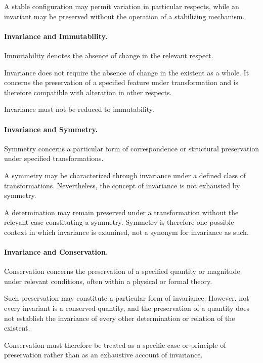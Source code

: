 A stable configuration may permit variation in
particular respects, while an invariant may be
preserved without the operation of a stabilizing
mechanism.

\paragraph{Invariance and Immutability.}

Immutability denotes the absence of change in the
relevant respect.

Invariance does not require the absence of change
in the existent as a whole. It concerns the preservation
of a specified feature under transformation and is
therefore compatible with alteration in other respects.

Invariance must not be reduced to immutability.

\paragraph{Invariance and Symmetry.}

Symmetry concerns a particular form of correspondence
or structural preservation under specified transformations.

A symmetry may be characterized through invariance
under a defined class of transformations. Nevertheless,
the concept of invariance is not exhausted by symmetry.

A determination may remain preserved under a
transformation without the relevant case constituting
a symmetry. Symmetry is therefore one possible context
in which invariance is examined, not a synonym for
invariance as such.

\paragraph{Invariance and Conservation.}

Conservation concerns the preservation of a specified
quantity or magnitude under relevant conditions,
often within a physical or formal theory.

Such preservation may constitute a particular form
of invariance. However, not every invariant is a
conserved quantity, and the preservation of a quantity
does not establish the invariance of every other
determination or relation of the existent.

Conservation must therefore be treated as a specific
case or principle of preservation rather than as
an exhaustive account of invariance.

